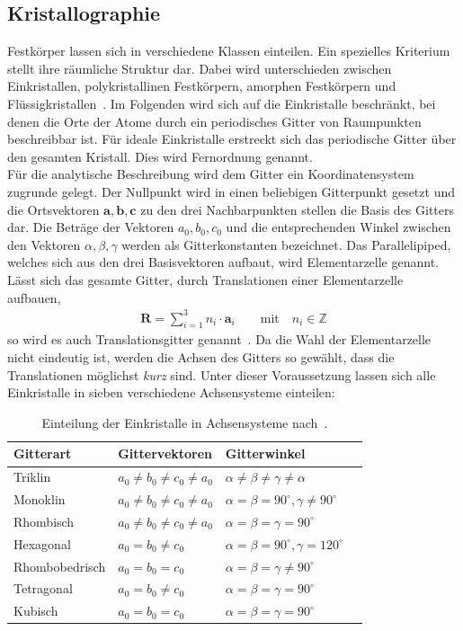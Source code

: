 \documentclass[a4paper,twoside,final]{article}
\begin{document}
\subsection{Kristallographie}
Festkörper lassen sich in verschiedene Klassen einteilen. Ein spezielles Kriterium stellt ihre räumliche Struktur dar. Dabei wird unterschieden zwischen Einkristallen, polykristallinen Festkörpern, amorphen Festkörpern und Flüssigkristallen~\cite{Demtroeder}. Im Folgenden wird sich auf die Einkristalle beschränkt, bei denen die Orte der Atome durch ein periodisches Gitter von Raumpunkten beschreibbar ist. Für ideale Einkristalle erstreckt sich das periodische Gitter über den gesamten Kristall. Dies wird Fernordnung genannt.\\
Für die analytische Beschreibung wird dem Gitter ein Koordinatensystem zugrunde gelegt. Der Nullpunkt wird in einen beliebigen Gitterpunkt gesetzt und die Ortsvektoren $\bm{a}, \bm{b}, \bm{c}$ zu den drei Nachbarpunkten stellen die Basis des Gitters dar. Die Beträge der Vektoren $a_0, b_0, c_0$ und die entsprechenden Winkel zwischen den Vektoren $\alpha, \beta, \gamma$ werden als Gitterkonstanten bezeichnet. Das Parallelipiped, welches sich aus den drei Basisvektoren aufbaut, wird Elementarzelle genannt. Lässt sich das gesamte Gitter, durch Translationen einer Elementarzelle aufbauen,
\begin{align}
  \bm{R} = \sum_{i=1}^3 n_i \cdot \bm{a}_i \qquad \text{mit}\quad n_i \in \mathbb{Z}
\end{align}
so wird es auch Translationsgitter genannt~\cite{Demtroeder}. Da die Wahl der Elementarzelle nicht eindeutig ist, werden die Achsen des Gitters so gewählt, dass die Translationen möglichst \textit{kurz} sind. Unter dieser Voraussetzung lassen sich alle Einkristalle in sieben verschiedene Achsensysteme einteilen:
\begin{table}[ht]
	\centering
	\caption{Einteilung der Einkristalle in Achsensysteme nach~\cite{Kleber}.}
	\label{tab:Achsensysteme}
	\begin{tabular}{l l l l}
		\toprule
	   Gitterart & Gittervektoren & Gitterwinkel\\
	 	\midrule
			Triklin & $a_0 \neq b_0 \neq c_0 \neq a_0$ & $\alpha \neq \beta \neq \gamma\neq \alpha$\\
			Monoklin & $a_0 \neq b_0 \neq c_0 \neq a_0$ & $\alpha = \beta = 90^\circ, \gamma\neq 90^\circ$\\
      Rhombisch & $a_0 \neq b_0 \neq c_0 \neq a_0$ & $\alpha = \beta =\gamma =90^\circ$\\
      Hexagonal & $a_0 = b_0 \neq c_0$ & $\alpha = \beta = 90^\circ, \gamma = 120^\circ$\\
      Rhombobedrisch & $a_0 = b_0 = c_0$ & $\alpha = \beta =\gamma \neq 90^\circ$\\
      Tetragonal & $a_0 = b_0 \neq c_0$ & $\alpha = \beta =\gamma =90^\circ$\\
      Kubisch & $a_0 = b_0 = c_0$ & $\alpha = \beta =\gamma =90^\circ$\\
	\end{tabular}
\end{table}\\
\end{document}
